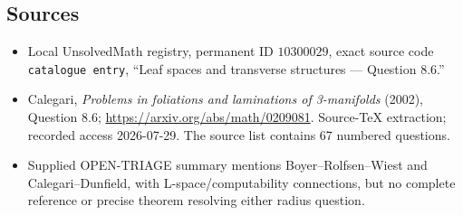 \documentclass[11pt]{article}
\begin{document}
\subsection{Sources}
\begin{itemize}
\item Local UnsolvedMath registry, permanent ID \(10300029\), exact source code \texttt{catalogue entry}, ``Leaf spaces and transverse structures --- Question 8.6.''
\item Calegari, \emph{Problems in foliations and laminations of 3-manifolds} (2002), Question 8.6; \url{https://arxiv.org/abs/math/0209081}. Source-TeX extraction; recorded access 2026-07-29. The source list contains 67 numbered questions.
\item Supplied OPEN-TRIAGE summary mentions Boyer--Rolfsen--Wiest and Calegari--Dunfield, with L-space/computability connections, but no complete reference or precise theorem resolving either radius question.
\end{itemize}
\end{document}
